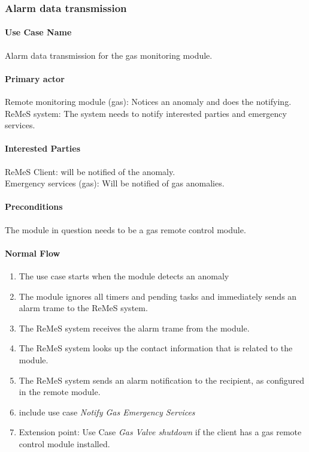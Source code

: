 \subsubsection{Alarm data transmission}

\paragraph{Use Case Name}
Alarm data transmission for the gas monitoring module.
\paragraph{Primary actor}
Remote monitoring module (gas): Notices an anomaly and does the notifying.\\
ReMeS system: The system needs to notify interested parties and emergency services.
\paragraph{Interested Parties}
ReMeS Client: will be notified of the anomaly. \\
Emergency services (gas): Will be notified of gas anomalies.
\paragraph{Preconditions}
The module in question needs to be a gas remote control module.
\paragraph{Normal Flow}
\begin{enumerate}
	\item The use case starts when the module detects an anomaly 
	\item The module ignores all timers and pending tasks and immediately sends an alarm trame to the ReMeS system.
	\item The ReMeS system receives the alarm trame from the module.
	\item The ReMeS system looks up the contact information that is related to the module.
	\item The ReMeS system sends an alarm notification to the recipient, as configured in the remote module.
	\item include use case \textit{Notify Gas Emergency Services}
	\item Extension point: Use Case \textit{Gas Valve shutdown} if the client has a gas remote control module installed.
\end{enumerate}

